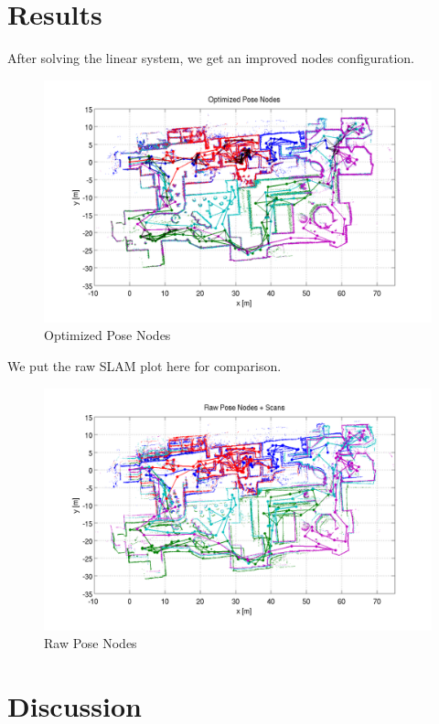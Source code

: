 \documentclass[twoside]{article}
\begin{document}
\begin{multicols}{2}
\section{Results}
After solving the linear system, we get an improved nodes configuration. 
\begin{figure}[H]
\centering
\includegraphics[width=\columnwidth]{fig/opt_scan.pdf}
\caption{Optimized Pose Nodes}
\label{fig:opt_scan}
\end{figure}
We put the raw SLAM plot here for comparison.
\begin{figure}[H]
\centering
\includegraphics[width=\columnwidth]{fig/raw_scan.pdf}
\caption{Raw Pose Nodes}
\label{fig:raw}
\end{figure}

\section{Discussion}


\end{multicols}
\end{document}
